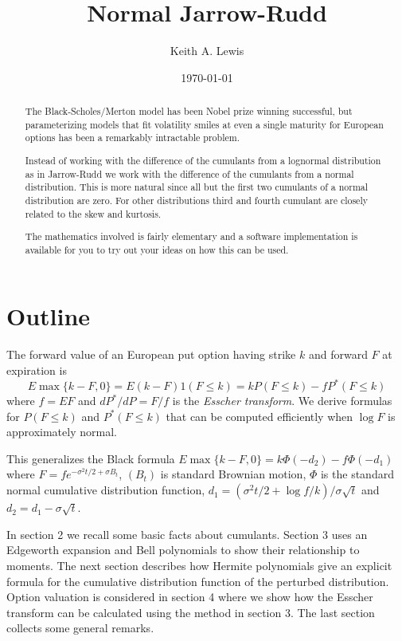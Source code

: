 \documentclass[11pt]{article}
\title{Normal Jarrow-Rudd}
\author{Keith A. Lewis}
\date{\today}
\theoremstyle{definition}
\begin{document}
\maketitle
\begin{abstract}
The Black-Scholes/Merton model has been Nobel prize winning successful,
but parameterizing models that fit volatility smiles at even a single
maturity for European options has been a remarkably
intractable problem.

Instead of working with the difference of the cumulants from a lognormal
distribution as in Jarrow-Rudd \cite{JarRud1982} we work with the
difference of the cumulants from a normal distribution.  This is more
natural since all but the first two cumulants of a normal distribution
are zero. For other distributions third and fourth cumulant are closely
related to the skew and kurtosis.

The mathematics involved is fairly elementary and a software
implementation is available for you to try out your ideas
on how this can be used.
\end{abstract}

\section{Outline}
The forward value of an European put option having strike \(k\)
and forward $F$ at expiration is
\[
E\max\{k - F, 0\} = E(k - F)1(F \le k) = kP(F\le k) - fP^*(F\le k)
\]
where $f = EF$ and $dP^*/dP = F/f$
is the {\em Esscher transform}\cite{Ess1932}.
We derive formulas for
\(P(F\le k)\) and \(P^*(F\le k)\) that can be computed
efficiently when $\log F$ is approximately normal.

This generalizes the Black formula
\(E\max\{k - F,0\} = k\Phi(-d_2) - f\Phi(-d_1)\)
where \(F = fe^{-\sigma^2t/2 + \sigma B_t}\), \((B_t)\) is
standard Brownian motion, \(\Phi\) is the standard normal cumulative
distribution function, \(d_1 = (\sigma^2 t/2
+ \log f/k)/\sigma\sqrt{t}\) and \(d_2 = d_1 - \sigma\sqrt{t}\).

In section 2 we recall some basic facts about cumulants.  Section 3 uses
an Edgeworth expansion and Bell polynomials to show their relationship
to moments.
The next section describes how Hermite polynomials
give an explicit formula for the cumulative
distribution function of the perturbed distribution.  Option valuation
is considered in section 4 where we show how the Esscher transform can be
calculated using the method in section 3. The last section
collects some general remarks.
\end{document}
